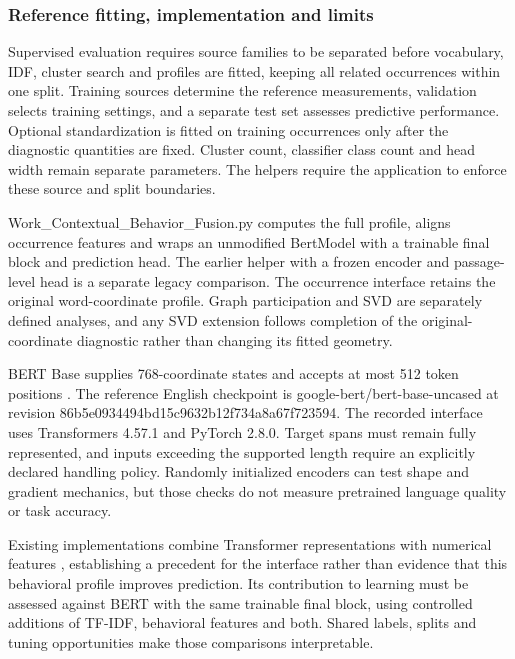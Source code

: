 \documentclass[10pt,letterpaper]{article}
\begin{document}
\subsubsection{Reference fitting, implementation and limits}
Supervised evaluation requires source families to be separated before vocabulary, IDF, cluster search and profiles are fitted, keeping all related occurrences within one split. Training sources determine the reference measurements, validation selects training settings, and a separate test set assesses predictive performance. Optional standardization is fitted on training occurrences only after the diagnostic quantities are fixed. Cluster count, classifier class count and head width remain separate parameters. The helpers require the application to enforce these source and split boundaries.\par

Work\_Contextual\_Behavior\_Fusion.py computes the full profile, aligns occurrence features and wraps an unmodified BertModel with a trainable final block and prediction head. The earlier helper with a frozen encoder and passage-level head is a separate legacy comparison. The occurrence interface retains the original word-coordinate profile. Graph participation and SVD are separately defined analyses, and any SVD extension follows completion of the original-coordinate diagnostic rather than changing its fitted geometry.\par

BERT Base supplies 768-coordinate states and accepts at most 512 token positions \cite{bert}. The reference English checkpoint is google-bert/bert-base-uncased at revision 86b5e093\allowbreak{}4494bd15\allowbreak{}c9632b12\allowbreak{}f734a8a6\allowbreak{}7f723594. The recorded interface uses Transformers 4.57.1 and PyTorch 2.8.0. Target spans must remain fully represented, and inputs exceeding the supported length require an explicitly declared handling policy. Randomly initialized encoders can test shape and gradient mechanics, but those checks do not measure pretrained language quality or task accuracy.\par

Existing implementations combine Transformer representations with numerical features \cite{multimodaltoolkit}, establishing a precedent for the interface rather than evidence that this behavioral profile improves prediction. Its contribution to learning must be assessed against BERT with the same trainable final block, using controlled additions of TF-IDF, behavioral features and both. Shared labels, splits and tuning opportunities make those comparisons interpretable.\par
\end{document}
